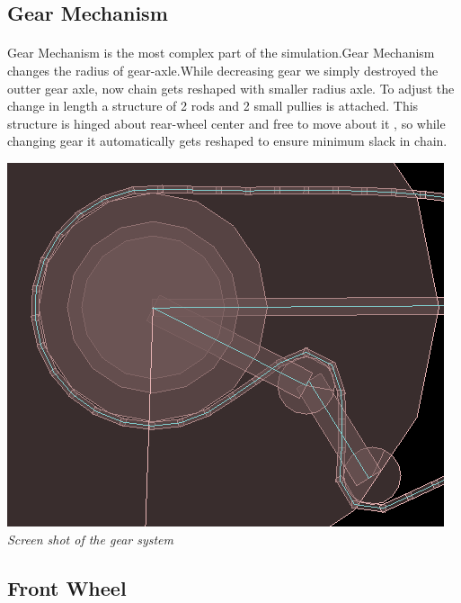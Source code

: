 \documentclass[11pt]{article}
\begin{document}
\subsection{Gear Mechanism}
\paragraph{}

	Gear Mechanism is the most complex part of the simulation.Gear Mechanism changes the radius of gear-axle.While decreasing gear we 
	simply destroyed the outter gear axle, now chain gets reshaped with smaller radius axle. To adjust the change in length a structure 
	of 2 rods and 2 small pullies is attached. This structure is hinged about rear-wheel center and free to move about it , so while 
	changing gear it automatically gets reshaped to ensure minimum slack in chain.     
	
	\begin{center}
	 \includegraphics[scale = 0.4]{images/gear} \\
	  \emph{Screen shot of the gear system} \\
	\end{center}

\subsection{Front Wheel}
\paragraph{}
\end{document}
